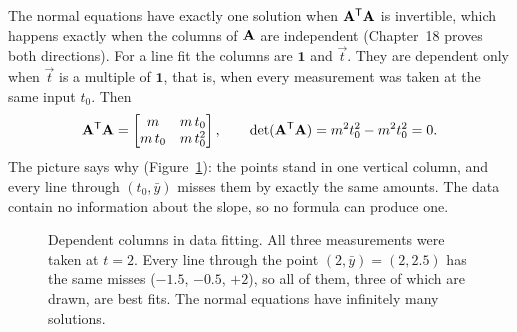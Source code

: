 The normal equations have exactly one solution when $\mathbf{A}^{\mathsf{T}}\mathbf{A}$ is invertible, which happens
exactly when the columns of $\mathbf{A}$ are independent (Chapter~18 proves both directions). For a
line fit the columns are $\mathbf{1}$ and $\vec{t}$. They are dependent only when $\vec{t}$ is a
multiple of $\mathbf{1}$, that is, when every measurement was taken at the same input $t_0$. Then
\[
  \mathbf{A}^{\mathsf{T}}\mathbf{A}
  = \begin{bmatrix} m & m\,t_0\\ m\,t_0 & m\,t_0^2\end{bmatrix},
  \qquad
  \det(\mathbf{A}^{\mathsf{T}}\mathbf{A}) = m^2t_0^2 - m^2t_0^2 = 0 .
\]
The picture says why (Figure~\ref{ch19:dependent-cols}): the points stand in one vertical column,
and every line through $(t_0,\bar{y})$ misses them by exactly the same amounts. The data contain no
information about the slope, so no formula can produce one.

\begin{figure}[htbp]
\centering
{}
\caption{Dependent columns in data fitting. All three measurements were taken at $t=2$. Every line
through the point $(2,\bar{y})=(2,2.5)$ has the same misses ($-1.5$, $-0.5$, $+2$), so all of them,
three of which are drawn, are best fits. The normal equations have infinitely many solutions.}
\label{ch19:dependent-cols}
\end{figure}

